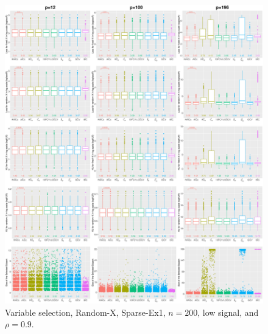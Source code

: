 \begin{figure}[!ht]
\centering
\includegraphics[width=\textwidth]{figures/supplement/randomx/subset_selection/Sparse-Ex1_n200_lsnr_rho09.eps}
\caption{Variable selection, Random-X, Sparse-Ex1, $n=200$, low signal, and $\rho=0.9$.}
\end{figure}
\clearpage
